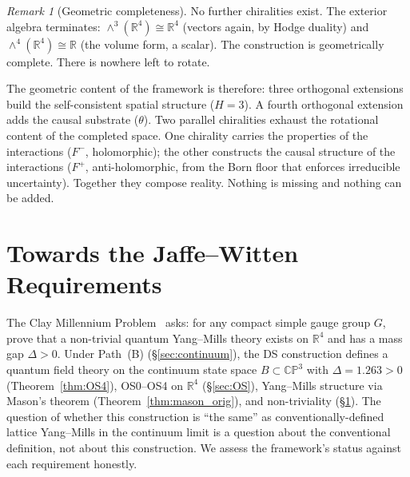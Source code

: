 \documentclass[11pt,a4paper]{article}
\theoremstyle{definition}
\theoremstyle{remark}
\newtheorem{remark}[theorem]{Remark}
\newcommand{\CP}{\mathbb{CP}}
\newcommand{\R}{\mathbb{R}}
\begin{document}
\begin{remark}[Geometric completeness]
No further chiralities exist. The exterior algebra terminates: $\wedge^3(\R^4)\cong\R^4$ (vectors again, by Hodge duality) and $\wedge^4(\R^4)\cong\R$ (the volume form, a scalar). The construction is geometrically complete. There is nowhere left to rotate.

The geometric content of the framework is therefore: three orthogonal extensions build the self-consistent spatial structure ($H=3$). A fourth orthogonal extension adds the causal substrate ($\theta$). Two parallel chiralities exhaust the rotational content of the completed space. One chirality carries the properties of the interactions ($F^-$, holomorphic); the other constructs the causal structure of the interactions ($F^+$, anti-holomorphic, from the Born floor that enforces irreducible uncertainty). Together they compose reality. Nothing is missing and nothing can be added.
\end{remark}


\section{Towards the Jaffe--Witten Requirements}\label{sec:JW}

The Clay Millennium Problem~\cite{JW2000} asks: for any compact simple gauge group $G$, prove that a non-trivial quantum Yang--Mills theory exists on $\R^4$ and has a mass gap $\Delta>0$. Under Path~(B) (\S\ref{sec:continuum}), the DS construction defines a quantum field theory on the continuum state space $B\subset\CP^3$ with $\Delta=1.263>0$ (Theorem~\ref{thm:OS4}), OS0--OS4 on $\R^4$ (\S\ref{sec:OS}), Yang--Mills structure via Mason's theorem (Theorem~\ref{thm:mason_orig}), and non-triviality (\S\ref{sec:JW}). The question of whether this construction is ``the same'' as conventionally-defined lattice Yang--Mills in the continuum limit is a question about the conventional definition, not about this construction. We assess the framework's status against each requirement honestly.
\end{document}
